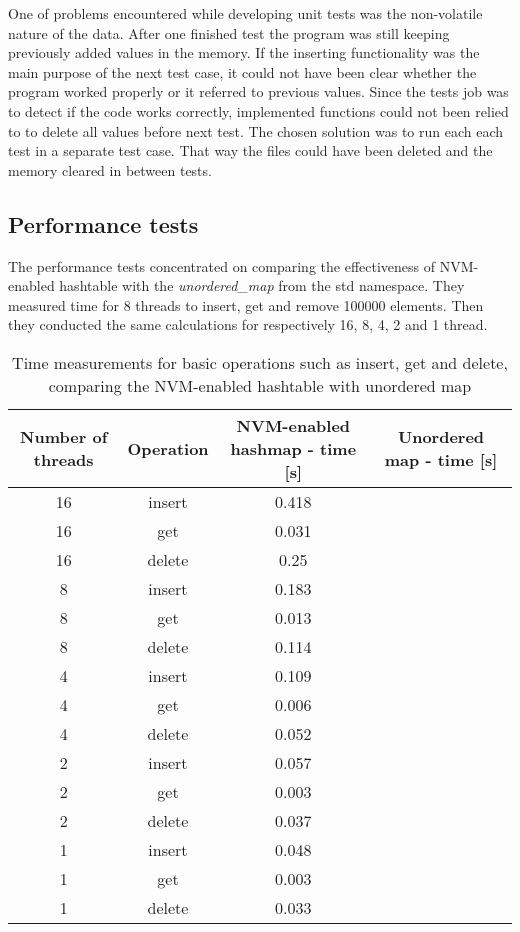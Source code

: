     One of problems encountered while developing unit tests was the non-volatile nature of the data. After one finished test the program was still keeping previously added values in the memory. If the inserting functionality was the main purpose of the next test case, it could not have been clear whether the program worked properly or it referred to previous values. Since the tests job was to detect if the code works correctly, implemented functions could not been relied to to delete all values before next test. The chosen solution was to run each each test in a separate test case. That way the files could have been deleted and the memory cleared in between tests.
    
\subsection{Performance tests}

    The performance tests concentrated on comparing the effectiveness of NVM-enabled hashtable with the \textit{unordered\_map} from the std namespace. They measured time for 8 threads to insert, get and remove 100000 elements. Then they conducted the same calculations for respectively 16, 8, 4, 2 and 1 thread. 

    \begin{table}[h]
    \caption{Time measurements for basic operations such as insert, get and delete, comparing the NVM-enabled hashtable with unordered map}\label{tab:tabela}
    \centering\footnotesize%
        \begin{tabular}{|c|c|c|c|} 
            \toprule
            Number of threads & Operation & NVM-enabled hashmap - time [s] & Unordered map - time [s] \\
            \midrule
            16 & insert & 0.418 & \\
            16 & get & 0.031 &    \\
            16 & delete & 0.25 &  \\
            \midrule
            8 & insert & 0.183 &  \\
            8 & get & 0.013 &     \\
            8 & delete & 0.114 &  \\
            \midrule
            4 & insert & 0.109 &  \\
            4 & get & 0.006 &     \\
            4 & delete & 0.052 &  \\
            \midrule
            2 & insert & 0.057 &  \\
            2 & get & 0.003 &     \\
            2 & delete & 0.037 &  \\
            \midrule
            1 & insert & 0.048 &  \\
            1 & get & 0.003 &     \\
            1 & delete & 0.033 &  \\
            \bottomrule
        \end{tabular}
    \end{table}

